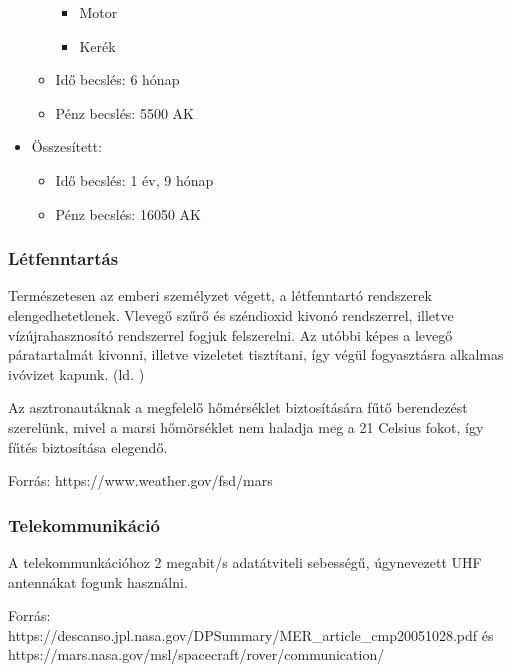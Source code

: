 \documentclass[12pt]{report}
\begin{document}
\begin{itemize}
\begin{itemize}
                \begin{itemize}
                    \item Motor
                    \item Kerék
                \end{itemize}
            \item Idő becslés: 6 hónap
            \item Pénz becslés: 5500 AK
        \end{itemize}
    \item Összesített:
        \begin{itemize}
            \item Idő becslés: 1 év, 9 hónap
            \item Pénz becslés: 16050 AK
        \end{itemize}
\end{itemize}

\subsubsection{Létfenntartás}

Természetesen az emberi személyzet végett, a létfenntartó rendszerek elengedhetetlenek. Vlevegő szűrő és széndioxid kivonó rendszerrel, illetve vízújrahasznosító rendszerrel fogjuk felszerelni. Az utóbbi képes a levegő páratartalmát kivonni, illetve vizeletet tisztítani, így végül fogyasztásra alkalmas ivóvizet kapunk. (ld. )

Az asztronautáknak a megfelelő hőmérséklet biztosítására fűtő berendezést szerelünk, mivel a marsi hőmörséklet nem haladja meg a 21 Celsius fokot, így fűtés biztosítása elegendő.

Forrás: https://www.weather.gov/fsd/mars


\subsubsection{Telekommunikáció}

A telekommunkációhoz 2 megabit/s adatátviteli sebességű, úgynevezett UHF antennákat fogunk használni. 

Forrás: https://descanso.jpl.nasa.gov/DPSummary/MER\_article\_cmp20051028.pdf és https://mars.nasa.gov/msl/spacecraft/rover/communication/
\end{document}
